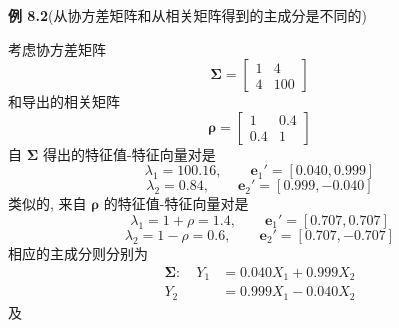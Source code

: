 \noindent\textbf{例 8.2}\quad (从协方差矩阵和从相关矩阵得到的主成分是不同的)

考虑协方差矩阵
\[
\boldsymbol{\Sigma}=\begin{bmatrix}1&4\\4&100\end{bmatrix}
\]
和导出的相关矩阵
\[
\boldsymbol{\rho}=\begin{bmatrix}1&0.4\\0.4&1\end{bmatrix}
\]
自 $\boldsymbol{\Sigma}$ 得出的特征值-特征向量对是
\[
\lambda_1=100.16,\qquad \mathbf{e}_1'=[0.040,0.999]
\]
\[
\lambda_2=0.84,\qquad \mathbf{e}_2'=[0.999,-0.040]
\]
类似的, 来自 $\boldsymbol{\rho}$ 的特征值-特征向量对是
\[
\lambda_1=1+\rho=1.4,\qquad \mathbf{e}_1'=[0.707,0.707]
\]
\[
\lambda_2=1-\rho=0.6,\qquad \mathbf{e}_2'=[0.707,-0.707]
\]
相应的主成分则分别为
\[
\begin{aligned}
\boldsymbol{\Sigma}:\quad Y_1&=0.040X_1+0.999X_2\\
Y_2&=0.999X_1-0.040X_2
\end{aligned}
\]
及
